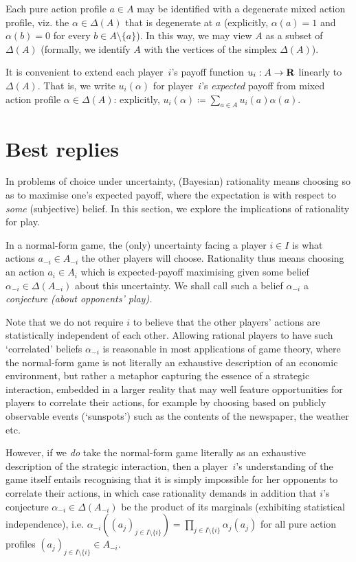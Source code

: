 Each pure action profile $a \in A$ may be identified with a degenerate mixed action profile, viz. the $\alpha \in \Delta(A)$ that is degenerate at $a$ (explicitly, $\alpha(a)=1$ and $\alpha(b)=0$ for every $b \in A \setminus \{a\}$). In this way, we may view $A$ as a subset of $\Delta(A)$ (formally, we identify $A$ with the vertices of the simplex $\Delta(A)$).

It is convenient to extend each player~$i$'s payoff function $u_i : A \to \mathbf{R}$ linearly to $\Delta(A)$. That is, we write $u_i(\alpha)$ for player~$i$'s \emph{expected} payoff from mixed action profile $\alpha \in \Delta(A)$: explicitly, $u_i(\alpha) \coloneqq \sum_{a \in A} u_i(a) \alpha(a)$.



\section{Best replies}
\label{dom:br}

In problems of choice under uncertainty, (Bayesian) rationality means choosing so as to maximise one's expected payoff, where the expectation is with respect to \emph{some} (subjective) belief. In this section, we explore the implications of rationality for play.

In a normal-form game, the (only) uncertainty facing a player $i \in I$ is what actions $a_{-i} \in A_{-i}$ the other players will choose. Rationality thus means choosing an action $a_i \in A_i$ which is expected-payoff maximising given some belief $\alpha_{-i} \in \Delta(A_{-i})$ about this uncertainty. We shall call such a belief $\alpha_{-i}$ a \emph{conjecture (about opponents' play).}

Note that we do not require $i$ to believe that the other players' actions are statistically independent of each other. Allowing rational players to have such `correlated' beliefs $\alpha_{-i}$ is reasonable in most applications of game theory, where the normal-form game is not literally an exhaustive description of an economic environment, but rather a metaphor capturing the essence of a strategic interaction, embedded in a larger reality that may well feature opportunities for players to correlate their actions, for example by choosing based on publicly observable events (`sunspots') such as the contents of the newspaper, the weather etc.

However, if we \emph{do} take the normal-form game literally as an exhaustive description of the strategic interaction, then a player~$i$'s understanding of the game itself entails recognising that it is simply impossible for her opponents to correlate their actions, in which case rationality demands in addition that $i$'s conjecture $\alpha_{-i} \in \Delta(A_{-i})$ be the product of its marginals (exhibiting statistical independence), i.e. $\alpha_{-i}((a_j)_{j \in I \setminus \{i\}}) = \prod_{j \in I \setminus \{i\}} \alpha_j(a_j)$ for all pure action profiles $(a_j)_{j \in I \setminus \{i\}} \in A_{-i}$.

